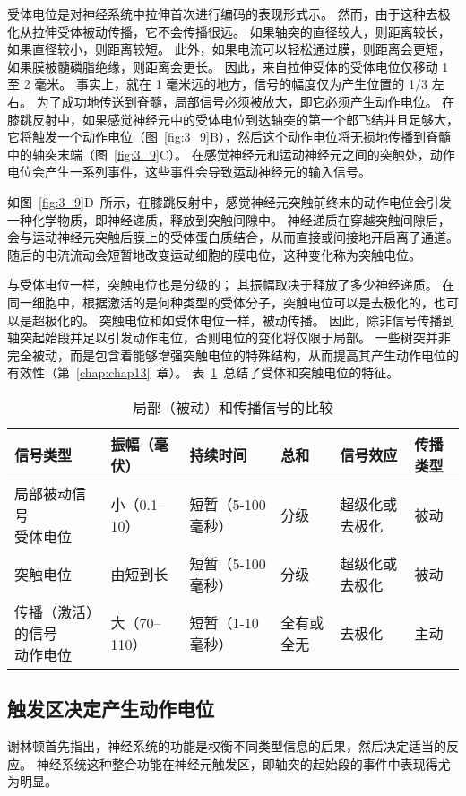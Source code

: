 受体电位是对神经系统中拉伸首次进行编码的表现形式示。
然而，由于这种去极化从拉伸受体被动传播，它不会传播很远。
如果轴突的直径较大，则距离较长，如果直径较小，则距离较短。
此外，如果电流可以轻松通过膜，则距离会更短，如果膜被髓磷脂绝缘，则距离会更长。
因此，来自拉伸受体的受体电位仅移动 1 至 2 毫米。
事实上，就在 1 毫米远的地方，信号的幅度仅为产生位置的 1/3 左右。
为了成功地传送到脊髓，局部信号必须被放大，即它必须产生动作电位。
在膝跳反射中，如果感觉神经元中的受体电位到达轴突的第一个郎飞结并且足够大，它将触发一个动作电位（图~\ref{fig:3_9}B），然后这个动作电位将无损地传播到脊髓中的轴突末端（图~\ref{fig:3_9}C）。 
在感觉神经元和运动神经元之间的突触处，动作电位会产生一系列事件，这些事件会导致运动神经元的输入信号。


如图~\ref{fig:3_9}D~所示，在膝跳反射中，感觉神经元突触前终末的动作电位会引发一种化学物质，即神经递质，释放到突触间隙中。
神经递质在穿越突触间隙后，会与运动神经元突触后膜上的受体蛋白质结合，从而直接或间接地开启离子通道。
随后的电流流动会短暂地改变运动细胞的膜电位，这种变化称为突触电位。


与受体电位一样，突触电位也是分级的； 
其振幅取决于释放了多少神经递质。 
在同一细胞中，根据激活的是何种类型的受体分子，突触电位可以是去极化的，也可以是超极化的。 
突触电位和如受体电位一样，被动传播。 
因此，除非信号传播到轴突起始段并足以引发动作电位，否则电位的变化将仅限于局部。
一些树突并非完全被动，而是包含着能够增强突触电位的特殊结构，从而提高其产生动作电位的有效性（第~\ref{chap:chap13}~章）。 
表~\ref{tab:3_1}~总结了受体和突触电位的特征。


\begin{table}[htbp]
	\caption{局部（被动）和传播信号的比较} \label{tab:3_1} \centering
	\begin{tabular}{llllll}
		\toprule
		信号类型 & 振幅（毫伏） & 持续时间 & 总和 & 信号效应 & 传播类型\\
		\midrule
		\makecell{局部被动信号\\受体电位} & 小（0.1–10） & 短暂（5-100毫秒） & 分级 & 超级化或去极化 & 被动 \\
		\midrule
		突触电位 & 由短到长 & 短暂（5-100毫秒） & 分级 & 超级化或去极化 & 被动 \\
		\makecell{传播（激活）的信号\\动作电位} & 大（70–110） & 短暂（1-10毫秒） & 全有或全无 & 
		去极化 & 主动 \\
		\bottomrule
	\end{tabular}
\end{table}


\subsection{触发区决定产生动作电位}
谢林顿首先指出，神经系统的功能是权衡不同类型信息的后果，然后决定适当的反应。 
神经系统这种整合功能在神经元触发区，即轴突的起始段的事件中表现得尤为明显。


